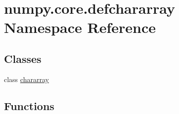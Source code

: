 \hypertarget{namespacenumpy_1_1core_1_1defchararray}{}\section{numpy.\+core.\+defchararray Namespace Reference}
\label{namespacenumpy_1_1core_1_1defchararray}
\subsection*{Classes}
\begin{DoxyCompactItemize}
\item 
class \hyperlink{classnumpy_1_1core_1_1defchararray_1_1chararray}{chararray}
\end{DoxyCompactItemize}
\subsection*{Functions}
